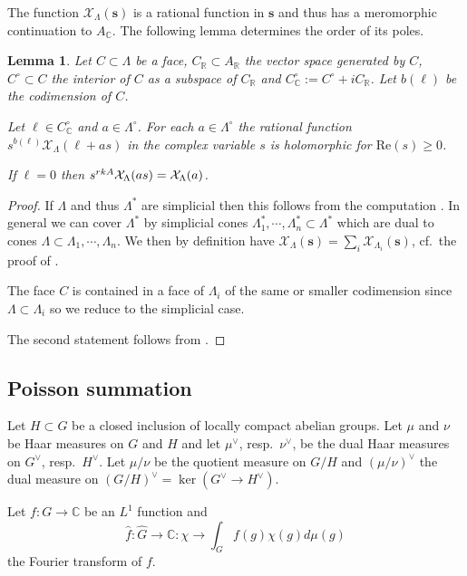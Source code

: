\documentclass[a4paper,11pt,reqno]{amsart}
\newcommand{\R}{\mathbb{R}}
\newcommand{\C}{\mathbb{C}}
\renewcommand{\Re}{\mathrm{Re}}
\newtheorem{lemma}[theorem]{Lemma}
\theoremstyle{definition}
\begin{document}
The function $\mathcal{X}_{\Lambda}(\bm{s})$ is a rational function in $\mathbf{s}$ \cite[Prop. 5.4]{Batyrev1998Manin} and thus has a meromorphic continuation to $A_{\C}$. The following lemma determines the order of its poles.
\begin{lemma}\label{Poles of characteristic functions of cones}
	Let $C \subset \Lambda$ be a face, $C_{\R} \subset A_{\R}$ the vector space generated by $C$, $C^{\circ} \subset C$ the interior of $C$ as a subspace of $C_{\R}$ and $C^{\circ}_{\C} := C^{\circ} + i C_{\R}$. Let $b(\ell)$ be the codimension of $C$.
	
	Let $\ell \in C^{\circ}_{\C}$ and $a \in \Lambda^{\circ}$. For each $a \in \Lambda^{\circ}$ the rational function $s^{b(\ell)} \mathcal{X}_{\Lambda}(\ell + as)$ in the complex variable $s$ is holomorphic for $\Re(s) \geq 0$.
	
	If $\ell = 0$ then $s^{\emph{rk} A} \mathcal{X}_{\Lambda}(as) = \mathcal{X}_{\Lambda}(a)$.
\end{lemma}
\begin{proof}
	If $\Lambda$ and thus $\Lambda^*$ are simplicial then this follows from the computation \cite[Prop. 5.3:(ii)]{Batyrev1998Manin}. In general we can cover $\Lambda^*$ by simplicial cones $\Lambda_{1}^*, \cdots, \Lambda_{n}^* \subset \Lambda^*$ which are dual to cones $\Lambda \subset \Lambda_{1}, \cdots, \Lambda_{n}$. We then by definition have $\mathcal{X}_{\Lambda}(\bm{s}) = \sum_i \mathcal{X}_{\Lambda_i}(\bm{s})$, cf.~the proof of \cite[Prop. 5.4]{Batyrev1998Manin}. 
	
	The face $C$ is contained in a face of $\Lambda_i$ of the same or smaller codimension since $\Lambda \subset \Lambda_i$ so we reduce to the simplicial case.
	
	The second statement follows from \cite[Prop.~5.3(i)]{Batyrev1998Manin}.
\end{proof}
\subsection{Poisson summation}
Let $H \subset G$ be a closed inclusion of locally compact abelian groups. Let $\mu$ and $\nu$ be Haar measures on $G$ and $H$ and let $\mu^{\vee}$, resp.~$\nu^{\vee}$, be the dual Haar measures on $G^{\vee}$, resp.~$H^{\vee}$. Let $\mu / \nu$ be the quotient measure on $G/H$ and $(\mu / \nu)^{\vee}$ the dual measure on $(G/H)^{\vee} = \ker(G^{\vee} \to H^{\vee})$.

Let $f: G \to \C$ be an $L^1$ function and 
\[\hat{f}: \hat{G} \to \C: \chi \to \int_{G} f(g) \chi(g) d \mu(g)\]
the Fourier transform of $f$.
\end{document}
